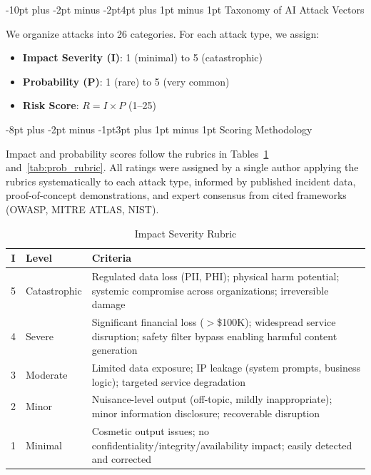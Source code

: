 \documentclass[conference]{IEEEtran}
\makeatletter
\renewcommand{\section}{\@startsection{section}{1}{\z@}%
  {-10pt plus -2pt minus -2pt}{4pt plus 1pt minus 1pt}%
  {\normalfont\large\bfseries\sffamily\color{accentdark}}}
\renewcommand{\subsection}{\@startsection{subsection}{2}{\z@}%
  {-8pt plus -2pt minus -1pt}{3pt plus 1pt minus 1pt}%
  {\normalfont\normalsize\bfseries\sffamily\color{accentblue}}}
\newcommand{\tableheaderrow}{\rowcolor{accentblue}}
\renewcommand{\thead}[1]{\textbf{\color{white}\sffamily #1}}
\makeatother
\begin{document}
\section{Taxonomy of AI Attack Vectors}


We organize attacks into 26 categories. For each attack type, we assign:
\begin{itemize}[leftmargin=*]
    \item \textbf{Impact Severity (I)}: 1 (minimal) to 5 (catastrophic)
    \item \textbf{Probability (P)}: 1 (rare) to 5 (very common)
    \item \textbf{Risk Score}: $R = I \times P$ (1--25)
\end{itemize}

\subsection{Scoring Methodology}\label{sec:scoring}

Impact and probability scores follow the rubrics in Tables~\ref{tab:impact_rubric} and~\ref{tab:prob_rubric}. All ratings were assigned by a single author applying the rubrics systematically to each attack type, informed by published incident data, proof-of-concept demonstrations, and expert consensus from cited frameworks (OWASP, MITRE ATLAS, NIST).

\begin{table}[!htbp]
\centering
\caption{Impact Severity Rubric}
\label{tab:impact_rubric}
\renewcommand{\arraystretch}{1.2}
\scriptsize\sffamily
\begin{tabular}{cp{2.5cm}p{3.8cm}}
\toprule
\tableheaderrow \thead{I} & \thead{Level} & \thead{Criteria} \\
\toprule
\rowcolor{rowalt} 5 & Catastrophic & Regulated data loss (PII, PHI); physical harm potential; systemic compromise across organizations; irreversible damage \\
4 & Severe & Significant financial loss ($>$\$100K); widespread service disruption; safety filter bypass enabling harmful content generation \\
\rowcolor{rowalt} 3 & Moderate & Limited data exposure; IP leakage (system prompts, business logic); targeted service degradation \\
2 & Minor & Nuisance-level output (off-topic, mildly inappropriate); minor information disclosure; recoverable disruption \\
\rowcolor{rowalt} 1 & Minimal & Cosmetic output issues; no confidentiality/integrity/availability impact; easily detected and corrected \\
\bottomrule
\end{tabular}
\end{table}
\end{document}
